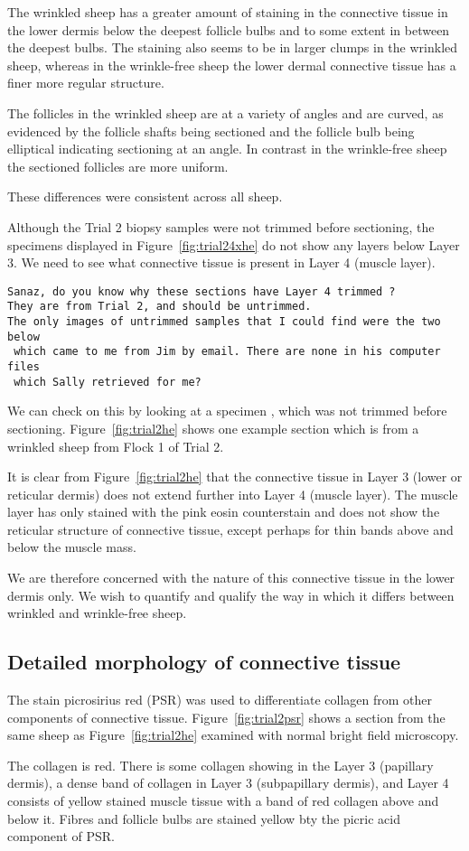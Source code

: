 \documentclass[titlepage]{article}  %
\begin{document}
The wrinkled sheep has a greater amount of staining in the  connective tissue in the lower dermis below the deepest follicle bulbs and to some extent in between the deepest bulbs. The staining also seems to be in larger clumps in the wrinkled sheep, whereas in the wrinkle-free sheep the lower dermal connective tissue has a finer more regular structure. 

  The follicles in the wrinkled sheep are at a variety of angles and are curved, as evidenced by the follicle shafts being sectioned and the follicle bulb being elliptical indicating sectioning at an angle. In contrast in the wrinkle-free sheep the sectioned follicles are more uniform. 

These differences were consistent across all sheep.

Although the Trial 2 biopsy samples were not trimmed before sectioning, the specimens displayed in Figure~\ref{fig:trial24xhe} do not show any layers below Layer 3. We need to see what connective tissue is present in Layer 4 (muscle layer). 
\begin{verbatim}
Sanaz, do you know why these sections have Layer 4 trimmed ? 
They are from Trial 2, and should be untrimmed.
The only images of untrimmed samples that I could find were the two below
 which came to me from Jim by email. There are none in his computer files
 which Sally retrieved for me?
\end{verbatim}

  We can check on this by looking at a specimen , which was not trimmed before sectioning. Figure~\ref{fig:trial2he} shows one example section which is from a wrinkled sheep from Flock 1 of Trial 2.


It is clear from Figure~\ref{fig:trial2he} that the connective tissue in Layer 3 (lower or reticular dermis) does not extend further into Layer 4 (muscle layer). The muscle layer has only stained with the pink eosin counterstain and does not show the reticular structure of  connective tissue, except perhaps for  thin bands above and below the muscle mass. 

We are therefore concerned with the nature of this connective tissue in the lower dermis only. We wish to quantify and qualify the way in which it differs between wrinkled and wrinkle-free sheep.

\subsection{Detailed morphology of connective tissue} 
The stain picrosirius red (PSR) was used to differentiate collagen from other components of connective tissue. Figure~\ref{fig:trial2psr} shows a section from the same sheep as Figure~\ref{fig:trial2he} examined with normal bright field microscopy. 

The collagen is red. There is some collagen showing in the Layer 3 (papillary dermis), a dense band of collagen in Layer 3 (subpapillary dermis), and Layer 4 consists of yellow stained muscle tissue with a band of red collagen above and below it.  Fibres and follicle bulbs are stained yellow bty the picric acid component of PSR.
\end{document}
